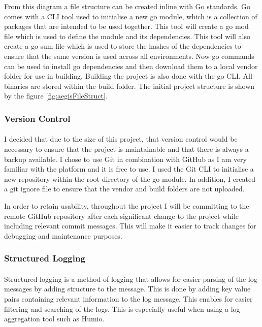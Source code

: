 \documentclass[12pt, conference, final, a4paper, onecolumn, compsoc]{IEEEtran}
\begin{document}

From this diagram a file structure can be created inline with Go standards. Go
comes with a CLI tool used to initialise a new go module, which is a collection
of packages that are intended to be used together. This tool will create a go
mod file which is used to define the module and its dependencies. This tool will
also create a go sum file which is used to store the hashes of the dependencies
to ensure that the same version is used across all environments. Now go commands
can be used to install go dependencies and then download them to a local vendor
folder for use in building. Building the project is also done with the go CLI.
All binaries are stored within the build folder. The initial project structure
is shown by the figure \ref{fig:aegisFileStruct}.

\subsubsection*{Version Control}
\paragraph{}
I decided that due to the size of this project, that version control would be
necessary to ensure that the project is maintainable and that there is always a
backup available. I chose to use Git in combination with GitHub as I am very
familiar with the platform and it is free to use. I used the Git CLI to
initialise a new repository within the root directory of the go module. In
addition, I created a git ignore file to ensure that the vendor and build
folders are not uploaded.

In order to retain usability, throughout the project I will be committing to the
remote GitHub repository after each significant change to the project while
including relevant commit messages. This will make it easier to track changes
for debugging and maintenance purposes.

\subsubsection*{Structured Logging}
\paragraph{}

Structured logging is a method of logging that allows for easier parsing of the
log messages by adding structure to the message. This is done by adding key
value pairs containing relevant information to the log message. This enables for
easier filtering and searching of the logs. This is especially useful when using
a log aggregation tool such as Humio.
\end{document}
